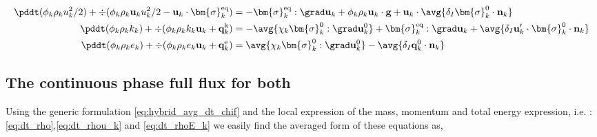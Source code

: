 \begin{align}
    \pddt (\phi_k \rho_ku_k^2/2)  
    + \div (
        \phi_k \rho_k\textbf{u}_ku_k^2/2
        - \textbf{u}_k \cdot \bm{\sigma}_k^\text{eq}
    )
    &= 
    - \bm{\sigma}_k^\text{eq} : \grad \textbf{u}_k
    + \phi_k \rho_k \textbf{u}_k\cdot \textbf{g} 
    +  \textbf{u}_k\cdot \avg{\delta_I \bm{\sigma}_k^0 \cdot \textbf{n}_k}\\
    \pddt (\phi_k\rho_kk_k)  
    + \div (
        \phi_k\rho_kk_k\textbf{u}_k
        + \textbf{q}_k^\text{k} 
        )
    &= 
    - \avg{\chi_k\bm{\sigma}_k^0 : \grad \textbf{u}_k^0}
    + \bm{\sigma}_k^\text{eq} : \grad \textbf{u}_k
    + \avg{\delta_I \textbf{u}_k' \cdot \bm{\sigma}_k^0 \cdot \textbf{n}_k}\\
    \pddt (\phi_k\rho_ke_k)  
    + \div (
        \phi_k \rho_ke_k\textbf{u}_k
        +
        \textbf{q}_k^\text{e} 
        )
    &= 
    \avg{\chi_k\bm{\sigma}_k^0 : \grad \textbf{u}_k^0}
    - \avg{\delta_I \textbf{q}_k^0 \cdot \textbf{n}_k} 
\end{align}

\subsection{The continuous phase full flux for both}

Using the generic formulation \ref{eq:hybrid_avg_dt_chif} and the local expression of the mass, momentum and total energy expression, i.e. : \ref{eq:dt_rho},\ref{eq:dt_rhou_k} and \ref{eq:dt_rhoE_k} we easily find the averaged form of these equations as, 

